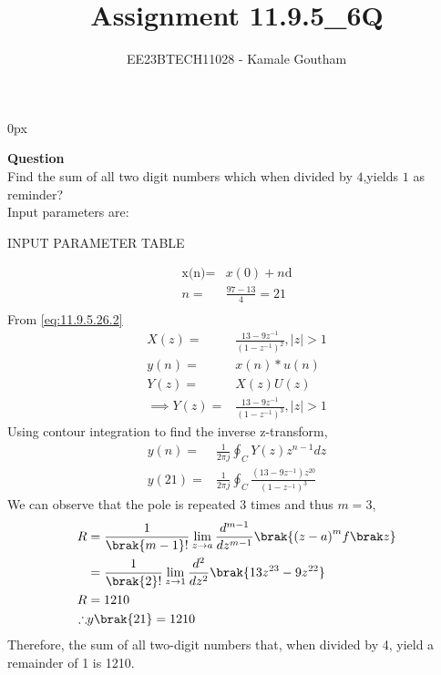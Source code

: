 \documentclass[journal,12pt,twocolumn]{IEEEtran}
\theoremstyle{remark}
\begin{document}
\parindent 0px

\title{Assignment 11.9.5\_6Q}
\author{EE23BTECH11028 - Kamale Goutham$^{}$%
}
\maketitle
\newpage
\bigskip
\textbf{Question}\\
Find the sum of all two digit numbers which when divided by $4$,yields $1$ as reminder?\\
\solution 
\fi
Input parameters are:\\
\begin{table}[ht]
    \centering
    \def\arraystretch{1.5}
    
    \caption{INPUT PARAMETER TABLE}
    \label{tab:11.9.5.6}
\end{table}
  \begin{align}
    \text{x(n)}=&x(0)+n{\text{d}}\\
    n=&\frac{97-13}{4}=21\\
\end{align}
From \ref{eq:11.9.5.26.2}
\begin{align}
X(z)=&\frac{13-9z^{-1}}{(1-z^{-1})^2},|z|>1\\
y(n)=&x(n)*u(n)\\ Y(z)=&X(z)U(z)\\\implies Y(z)=&{\frac{13-9z^{-1}}{(1-z^{-1})^{3}}},|z|>1
\end{align}
Using contour integration to find the inverse z-transform,
\begin{align}
    y(n)=&\frac{1}{2\pi j}\oint_{C}Y(z) z^{n-1} dz  \\y(21)=&\frac{1}{2\pi j}\oint_{C}{\frac{(13-9z^{-1})z^{20}}{(1-z^{-1})^{3}}}
\end{align}
We can observe that the pole is repeated $3$ times and thus $m=3$,
\begin{align}
    R&=\frac{1}{\brak {m-1}!}\lim\limits_{z\to a}\frac{d^{m-1}}{dz^{m-1}}\brak {{(z-a)}^{m}f\brak z}  \\&=\frac{1}{\brak {2}!}\lim\limits_{z\to 1}\frac{d^{2}}{dz^{2}}\brak{13z^{23}-9z^{22}}\\R&=1210\\
        \therefore &y\brak{21}=1210
\end{align}
Therefore, the sum of all two-digit numbers that, when divided by 4, yield a remainder of 1 is 1210.\\
\end{document}
